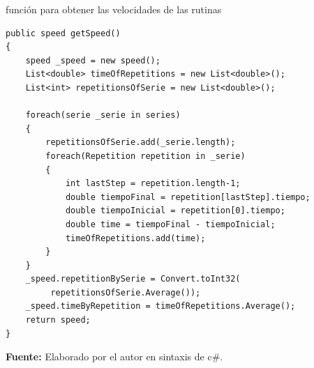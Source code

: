 \begin{code}[H]
	\caption{funci\'on para obtener las velocidades de las rutinas}
	\label{code:getTimeOfRepetitions}
	\begin{lstlisting}
public speed getSpeed()
{
	speed _speed = new speed();
	List<double> timeOfRepetitions = new List<double>();
	List<int> repetitionsOfSerie = new List<double>();
	
	foreach(serie _serie in series)
	{
		repetitionsOfSerie.add(_serie.length);
		foreach(Repetition repetition in _serie)
		{
			int lastStep = repetition.length-1;
			double tiempoFinal = repetition[lastStep].tiempo;
			double tiempoInicial = repetition[0].tiempo;
			double time = tiempoFinal - tiempoInicial;
			timeOfRepetitions.add(time);
		}			
	}
	_speed.repetitionBySerie = Convert.toInt32(
		 repetitionsOfSerie.Average());
	_speed.timeByRepetition = timeOfRepetitions.Average();
	return speed;
}
	\end{lstlisting}
	\textbf{Fuente:} Elaborado por el autor en sintaxis de c\#.
\end{code} 
